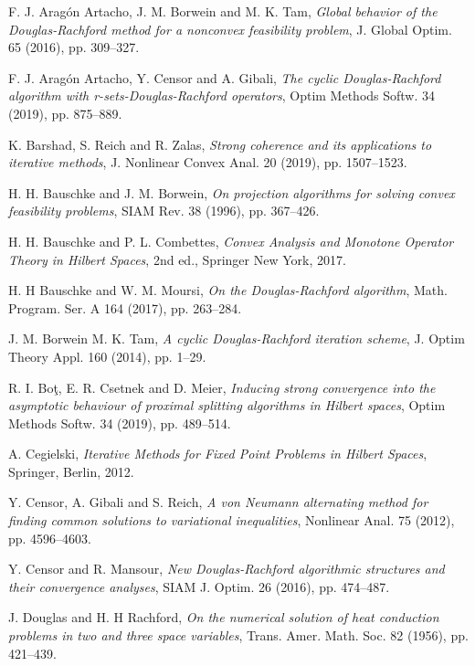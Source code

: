 \documentclass[]{interact}
\theoremstyle{plain}%
\theoremstyle{definition}
\theoremstyle{remark}
\begin{document}
\begin{thebibliography}{99}

F. J. Arag\'{o}n Artacho, J. M. Borwein and M. K. Tam,
\emph{Global behavior of the Douglas-Rachford method for a nonconvex feasibility
problem}, J. Global Optim. 65 (2016), pp. 309--327.

F. J. Arag\'{o}n Artacho, Y. Censor and A. Gibali, \emph{The
cyclic Douglas-Rachford algorithm with r-sets-Douglas-Rachford operators},
Optim Methods Softw. 34 (2019), pp. 875--889.

K. Barshad, S. Reich and R. Zalas, \emph{Strong coherence
and its applications to iterative methods}, J. Nonlinear Convex Anal.
20 (2019), pp. 1507--1523.

H. H. Bauschke and J. M. Borwein, \emph{On projection algorithms
for solving convex feasibility problems}, SIAM Rev. 38 (1996), pp. 367--426.

H. H. Bauschke and P. L. Combettes, \emph{Convex Analysis
and Monotone Operator Theory in Hilbert Spaces}, 2nd ed., Springer
New York, 2017.

H. H Bauschke and W. M. Moursi, \emph{On the Douglas-Rachford
algorithm}, Math. Program. Ser. A 164 (2017), pp. 263--284.

J. M. Borwein M. K. Tam, \emph{A cyclic Douglas-Rachford
iteration scheme}, J. Optim Theory Appl. 160 (2014), pp. 1--29.

R. I. Bo\c{t}, E. R. Csetnek and D. Meier, \emph{Inducing strong convergence into the asymptotic behaviour of proximal splitting
algorithms in Hilbert spaces}, Optim Methods Softw. 34 (2019), pp. 489--514.

A. Cegielski, \emph{Iterative Methods for Fixed Point Problems
in Hilbert Spaces}, Springer, Berlin, 2012.

Y. Censor, A. Gibali and S. Reich, \emph{A von Neumann
alternating method for finding common solutions to variational inequalities},
Nonlinear Anal. 75 (2012), pp. 4596--4603.

Y. Censor and R. Mansour, \emph{New Douglas-Rachford algorithmic
structures and their convergence analyses}, SIAM J. Optim. 26 (2016),
pp. 474--487.

J. Douglas and H. H Rachford, \emph{On the numerical solution
of heat conduction problems in two and three space variables}, Trans.
Amer. Math. Soc. 82 (1956), pp. 421--439.


\end{thebibliography}
\end{document}
